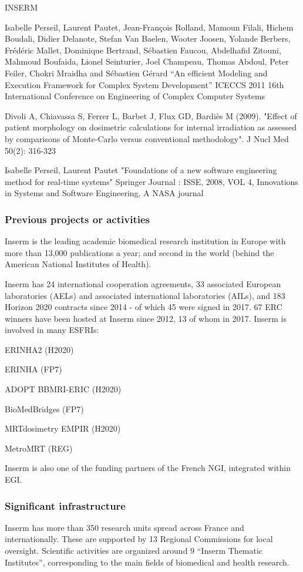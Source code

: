 \begin{sitedescription}{INSERM}
\begin{compactenum}
\item Isabelle Perseil, Laurent Pautet, Jean-Fran\c{c}ois Rolland, Mamoun
  Filali, Hichem Boudali, Didier Delanote, Stefan Van Baelen, Wooter Joosen,
  Yolande Berbers, Fr\'ed\'eric Mallet, Dominique Bertrand, S\'ebastien Faucou,
  Abdelhafid Zitouni, Mahmoud Boufaida, Lionel Seinturier, Joel Champeau,
  Thomas Abdoul, Peter Feiler, Chokri Mraidha and S\'ebastien G\'erard “An
  efficient Modeling and Execution Framework for Complex System Development”
  ICECCS 2011 16th International Conference on Engineering of Complex Computer
  Systems
  
\item Divoli A, Chiavassa S, Ferrer L, Barbet J, Flux GD, Bardi\`es M (2009).
  "Effect of patient morphology on dosimetric calculations for internal
  irradiation as assessed by comparisons of Monte-Carlo versus conventional
  methodology". J Nucl Med 50(2): 316-323
  
\item Isabelle Perseil, Laurent Pautet "Foundations of a new software
engineering method for real-time systems" Springer Journal : ISSE, 2008, VOL 4,
Innovations in Systems and Software Engineering, A NASA journal
\end{compactenum}

\subsubsection*{Previous projects or activities}
Inserm is the leading academic biomedical research institution in Europe with
more than 13,000 publications a year; and second in the world (behind the
American National Institutes of Health).

Inserm has 24 international cooperation agreements, 33 associated European
laboratories (AELs) and associated international laboratories (AILs), and 183
Horizon 2020 contracts since 2014 - of which 45 were signed in 2017. 67 ERC
winners have been hosted at Inserm since 2012, 13 of whom in 2017.  Inserm is
involved in many ESFRIs:
\begin{compactenum}
\item ERINHA2 (H2020)
\item ERINHA (FP7)
\item ADOPT BBMRI-ERIC (H2020)
\item BioMedBridges (FP7)
\item MRTdosimetry EMPIR (H2020)
\item MetroMRT (REG)
\end{compactenum}
Inserm is also one of the funding partners of the French NGI, integrated within
EGI.

\subsubsection*{Significant infrastructure}
Inserm has more than 350 research units spread across France and
internationally. These are supported by 13 Regional Commissions for local
oversight. Scientific activities are organized around 9 “Inserm Thematic
Institutes”, corresponding to the main fields of biomedical and health
research.

\end{sitedescription}
